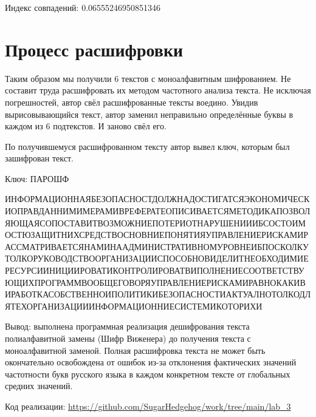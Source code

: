 \documentclass[a4paper, 14pt]{extarticle}
\begin{document}
Индекс совпадений: 0.06555246950851346

\section{Процесс расшифровки}

Таким образом мы получили 6 текстов с моноалфавитным шифрованием. Не составит труда расшифровать их методом частотного анализа текста. 
Не исключая погрешностей, автор свёл расшифрованные тексты воедино. Увидив вырисовывающийся текст, автор заменил неправильно определённые буквы в каждом из 6 подтекстов. И заново свёл его. 


По получившемуся расшифрованном тексту автор вывел ключ, которым был зашифрован текст. 

Ключ: ПАРОШФ

ИНФОРМАЦИОННАЯБЕЗОПАСНОСТДОЛЖНАДОСТИГАТСЯЭКОНОМИЧЕСКИОПРАВДАННИМИМЕРАМИВРЕФЕРАТЕОПИСИВАЕТСЯМЕТОДИКАПОЗВОЛЯЮЩАЯСОПОСТАВИТВОЗМОЖНИЕПОТЕРИОТНАРУШЕНИИИБСОСТОИМОСТЮЗАЩИТНИХСРЕДСТВОСНОВНИЕПОНЯТИЯУПРАВЛЕНИЕРИСКАМИРАССМАТРИВАЕТСЯНАМИНААДМИНИСТРАТИВНОМУРОВНЕИБПОСКОЛКУТОЛКОРУКОВОДСТВООРГАНИЗАЦИИСПОСОБНОВИДЕЛИТНЕОБХОДИМИЕРЕСУРСИИНИЦИИРОВАТИКОНТРОЛИРОВАТВИПОЛНЕНИЕСООТВЕТСТВУЮЩИХПРОГРАММВООБЩЕГОВОРЯУПРАВЛЕНИЕРИСКАМИРАВНОКАКИВИРАБОТКАСОБСТВЕННОИПОЛИТИКИБЕЗОПАСНОСТИАКТУАЛНОТОЛКОДЛЯТЕХОРГАНИЗАЦИИИНФОРМАЦИОННИЕСИСТЕМИКОТОРИХИ

Вывод: выполнена программная реализация дешифрования текста полиалфавитной замены (Шифр Виженера) до получения текста с моноалфавитной заменой. Полная расшифровка текста не может быть окончательно освобождена от ошибок из-за отклонения фактических значений частотности букв русского языка в каждом конкретном тексте от глобальных средних значений.

Код реализации: \url{https://github.com/SugarHedgehog/work/tree/main/lab_3}
\end{document}
